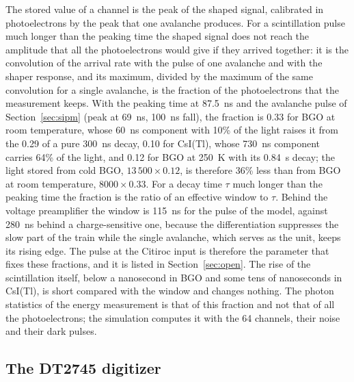 \documentclass[11pt]{article}
\newcommand{\us}{\textmu s\xspace}
\newcommand{\csitl}{CsI(Tl)\xspace}
\begin{document}
The stored value of a channel is the peak of the shaped signal, calibrated
in photoelectrons by the peak that one avalanche produces. For a
scintillation pulse much longer than the peaking time the shaped signal
does not reach the amplitude that all the photoelectrons would give if they
arrived together: it is the convolution of the arrival rate with the pulse
of one avalanche and with the shaper response, and its maximum, divided by
the maximum of the same convolution for a single avalanche, is the fraction
of the photoelectrons that the measurement keeps. With the peaking time at
87.5~ns and the avalanche pulse of Section~\ref{sec:sipm} (peak at 69~ns,
100~ns fall), the fraction is 0.33 for BGO at room temperature, whose
60~ns component with 10\% of the light raises it from the 0.29 of a pure
300~ns decay, 0.10 for
\csitl, whose 730~ns component carries 64\% of the light, and 0.12 for BGO
at 250~K with its 0.84~\us decay; the light stored from cold BGO,
$13\,500 \times 0.12$, is therefore 36\% less than from BGO at room
temperature, $8000 \times 0.33$. For a decay time $\tau$ much longer than
the peaking time the fraction is the ratio of an effective window to
$\tau$. Behind the voltage preamplifier the window is 115~ns for the pulse
of the model, against 280~ns behind a charge-sensitive one, because the
differentiation suppresses the slow part of the train while the single
avalanche, which serves as the unit, keeps its rising edge. The pulse at the
Citiroc input is therefore the parameter that fixes these fractions, and it
is listed in Section~\ref{sec:open}. The rise of the scintillation itself, below a
nanosecond in BGO and some tens of nanoseconds in \csitl, is short compared
with the window and changes nothing. The photon statistics of the energy
measurement is that of this fraction and not that of all the
photoelectrons; the simulation computes it with the 64 channels, their
noise and their dark pulses.

\subsection{The DT2745 digitizer}
\label{sec:digitizer}
\end{document}
